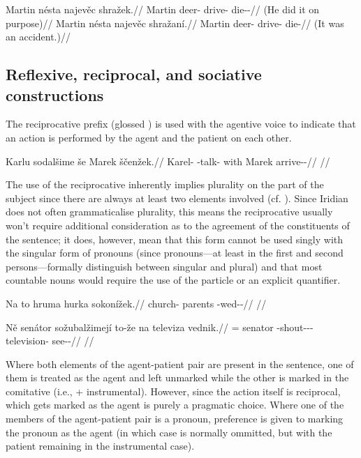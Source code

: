 \pex
\a
\begingl
	\gla Martin nésta najevěc shražek.//
	\glb Martin deer-\Acc{} drive-\Cv{} die-\Av{}-\Pf{}//
	\glft {} (He did it on purpose)//
\endgl
\a
\begingl
	\gla Martin nésta najevěc shražaní.//
	\glb Martin deer-\Acc{} drive-\Cv{} die-//
	\glft {} (It was an accident.)//
\endgl
\xe

\subsection{Reflexive, reciprocal, and sociative constructions}

The reciprocative prefix  (glossed \Rec{}) is used with the agentive
voice to indicate that an action is performed by the agent and the patient on
each other.

\pex
\begingl
\gla Karlu sodalšime še Marek ščenžek.//
\glb Karel-\Ins{} \Rec{}-talk- with Marek arrive-\Av{}-\Pf{}//
\glft {}//
\endgl
\xe

The use of the reciprocative inherently implies plurality on the part of the
subject since there are always at least two elements involved (cf.
\cite[255]{tesniere1965}). Since Iridian does not often grammaticalise
plurality, this means the reciprocative usually won't require
additional consideration as to the agreement of the constituents of the
sentence; it does, however, mean that this form cannot be used singly with the
singular form of pronouns (since pronouns---at least in the first and second
persons---formally distinguish between singular and plural) and that most
countable nouns would require the use of the particle  or an explicit
quantifier.

\pex
\begingl
\gla Na to hruma hurka sokonížek.//
\glb \Loc{} \Dem{} church-\Acc{} parents \Rec{}-wed-\Av{}-\Pf{}//
\glft {}//
\endgl
\xe

\pex
\begingl
\gla Ně senátor sožubalžimejí to-že na televiza vednik.//
\glb \Pl{}= senator \Rec{}-shout-\Av{}-\Prog{}-\Quot{} \Qp{} \Loc{} television-\Acc{} see-\Pv{}-\Pf{}//
\glft {}//
\endgl
\xe

Where both elements of the agent-patient pair are present in the sentence, one
of them is treated as the agent and left unmarked while the other is marked in
the comitative (i.e.,  + instrumental). However, since
the action itself is reciprocal, which gets marked as the agent is purely a
pragmatic choice. Where one of the members of the agent-patient pair is a
pronoun, preference is given to marking the pronoun as the agent (in which case
 is normally ommitted, but with the patient remaining in the
instrumental case).

